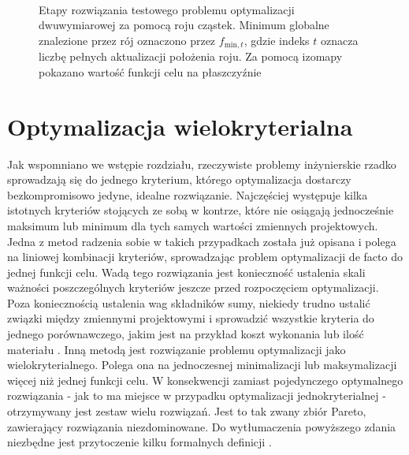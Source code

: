 \begin{figure}[H]
	\centering
	\\
	\captionsetup{justification=centering}
	\caption{Etapy rozwiązania testowego problemu optymalizacji dwuwymiarowej za pomocą roju cząstek. Minimum globalne znalezione przez rój oznaczono przez $f_{\text{min},t}$, gdzie indeks $t$ oznacza liczbę pełnych aktualizacji położenia roju. Za pomocą izomapy pokazano wartość funkcji celu na płaszczyźnie}
	\label{fig: pso_test_func_all}
\end{figure}



\section{Optymalizacja wielokryterialna} \label{sect: multiobjective_opt}
Jak wspomniano we wstępie rozdziału, rzeczywiste problemy inżynierskie rzadko sprowadzają się do jednego kryterium, którego optymalizacja dostarczy bezkompromisowo jedyne, idealne rozwiązanie. Najczęściej występuje kilka istotnych kryteriów stojących ze sobą w kontrze, które nie osiągają jednocześnie maksimum lub minimum dla tych samych wartości zmiennych projektowych. Jedna z metod radzenia sobie w takich przypadkach została już opisana i polega na liniowej kombinacji kryteriów, sprowadzając problem optymalizacji de facto do jednej funkcji celu. Wadą tego rozwiązania jest konieczność ustalenia skali ważności poszczególnych kryteriów jeszcze przed rozpoczęciem optymalizacji. Poza koniecznością ustalenia wag składników sumy, niekiedy trudno ustalić związki między zmiennymi projektowymi i sprowadzić wszystkie kryteria do jednego porównawczego, jakim jest na przykład koszt wykonania lub ilość materiału \parencite{Szymczak1995}. Inną metodą jest rozwiązanie problemu optymalizacji jako wielokryterialnego. Polega ona na jednoczesnej minimalizacji lub maksymalizacji więcej niż jednej funkcji celu. W konsekwencji zamiast pojedynczego optymalnego rozwiązania - jak to ma miejsce w przypadku optymalizacji jednokryterialnej - otrzymywany jest zestaw wielu rozwiązań. Jest to tak zwany zbiór Pareto, zawierający rozwiązania niezdominowane. Do wytłumaczenia powyższego zdania niezbędne jest przytoczenie kilku formalnych definicji \parencite{CoelloCoello2006}. 

